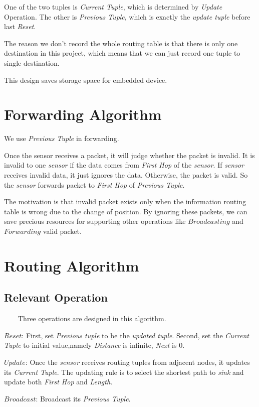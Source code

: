 \documentclass[a4paper]{article}
\begin{document}
One of the two tuples is \emph{Current Tuple}, which is determined by \emph{Update} Operation. The other is \emph{Previous Tuple}, which is exactly the \emph{update tuple} before last \emph{Reset}.

The reason we don't record the whole routing table is that there is only one destination in this project, which means that we can just record one tuple to single destination.

This design saves storage space for embedded device.

\section{Forwarding Algorithm}
We use \emph{Previous Tuple} in forwarding.

Once the sensor receives a packet, it will judge whether the packet is invalid. It is invalid to one \emph{sensor} if the data comes from \emph{First Hop} of the \emph{sensor}. If \emph{sensor} receives invalid data, it just ignores the data. Otherwise, the packet is valid. So the \emph{sensor} forwards packet to \emph{First Hop} of \emph{Previous Tuple}.

The motivation is that invalid packet exists only when the information routing table is wrong due to the change of position. By ignoring these packets, we can save precious resources for supporting other operations like $Broadcasting$ and $Forwarding$ valid packet.

\section{Routing Algorithm}

\subsection{Relevant Operation}
\ \ \ \ Three operations are designed in this algorithm.

$Reset$: First, set \emph{Previous tuple} to be the \emph{updated tuple}. Second, set the \emph{Current Tuple} to initial value,namely \emph{Distance} is infinite, \emph{Next} is 0.

$Update$: Once the \emph{sensor} receives routing tuples from adjacent nodes, it updates its \emph{Current Tuple}. The updating rule is to select the shortest path to \emph{sink} and update both \emph{First Hop} and \emph{Length}.

$Broadcast$: Broadcast its \emph{Previous Tuple}.
\end{document}
